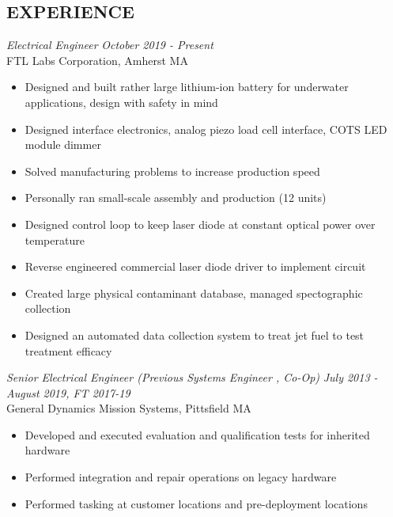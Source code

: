 \documentclass[line,mmmargin]{res}
\begin{document}
\begin{resume}
\section{EXPERIENCE} 
{\sl Electrical Engineer} \hfill {\sl October 2019 - Present}\\
	FTL Labs Corporation, Amherst MA
	\begin{itemize}  \itemsep -2pt %
		\item Designed and built rather large lithium-ion battery for
			underwater applications, design with safety in mind
		\item Designed interface electronics, analog piezo
			load cell interface, COTS LED module dimmer
		\item Solved manufacturing problems to increase production
			speed
		\item Personally ran small-scale assembly and production (12
			units)
		\item Designed control loop to keep laser diode at constant
			optical power over temperature
		\item Reverse engineered commercial laser diode driver to
			implement circuit
		\item Created large physical contaminant database, managed
			spectographic collection
		\item Designed an automated data collection system to treat jet
			fuel to test treatment efficacy 
	\end{itemize}
	\vspace{-10pt}
{\sl Senior Electrical Engineer (Previous Systems Engineer , Co-Op)} \hfill
{\sl July 2013 - August 2019, FT 2017-19}\\
	General Dynamics Mission Systems, Pittsfield MA
	\begin{itemize}  \itemsep -2pt %
		\item Developed and executed evaluation and qualification tests for inherited hardware
		\item Performed integration and repair operations on legacy hardware
		\item Performed tasking at customer locations and pre-deployment locations

\end{itemize}
\end{resume}
\end{document}
